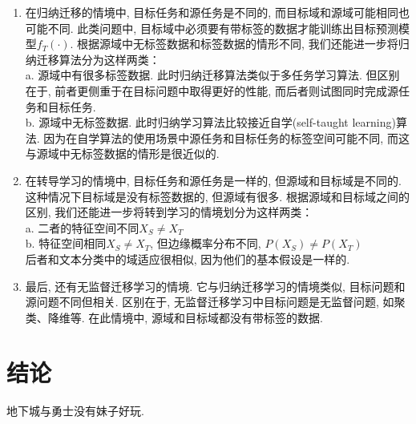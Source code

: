 \documentclass[10pt,journal,compsoc]{IEEEtran}
\begin{document}
\begin{enumerate}
\item 在归纳迁移的情境中, 目标任务和源任务是不同的, 而目标域和源域可能相同也可能不同. 此类问题中, 目标域中必须要有带标签的数据才能训练出目标预测模型$f_T(\cdot)$. 根据源域中无标签数据和标签数据的情形不同, 我们还能进一步将归纳迁移算法分为这样两类：\\
a. 源域中有很多标签数据. 此时归纳迁移算法类似于多任务学习算法. 但区别在于, 前者更侧重于在目标问题中取得更好的性能, 而后者则试图同时完成源任务和目标任务. \\
b. 源域中无标签数据. 此时归纳学习算法比较接近自学(self-taught learning)算法. 因为在自学算法的使用场景中源任务和目标任务的标签空间可能不同, 而这与源域中无标签数据的情形是很近似的. 

\item 在转导学习的情境中, 目标任务和源任务是一样的, 但源域和目标域是不同的. 这种情况下目标域是没有标签数据的, 但源域有很多. 根据源域和目标域之间的区别, 我们还能进一步将转到学习的情境划分为这样两类：\\
a. 二者的特征空间不同$X_S \ne X_T$\\
b. 特征空间相同$X_S \ne X_T$, 但边缘概率分布不同, $P(X_S) \ne P(X_T)$\\
后者和文本分类中的域适应很相似, 因为他们的基本假设是一样的. 
\item 最后, 还有无监督迁移学习的情境. 它与归纳迁移学习的情境类似, 目标问题和源问题不同但相关. 区别在于, 无监督迁移学习中目标问题是无监督问题, 如聚类、降维等. 在此情境中, 源域和目标域都没有带标签的数据. 
\end{enumerate}




\section{结论}

地下城与勇士没有妹子好玩. 



\end{document}
